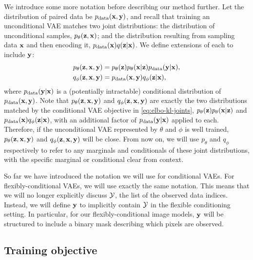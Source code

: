 We introduce some more notation before describing our method further. Let the
distribution of paired data be $p_{\rm{data}}({\mathbf{x}}, {\mathbf{y}})$, and recall that
training an unconditional VAE matches two joint distributions: the distribution
of unconditional samples, $p_\theta({\mathbf{z}}, {\mathbf{x}})$; and the distribution
resulting from sampling data ${\mathbf{x}}$ and then encoding it, $p_{\rm{data}}({\mathbf{x}})q({\mathbf{z}}|{\mathbf{x}})$. We define extensions of each to include ${\mathbf{y}}$:
\begin{align}
  p_\theta({\mathbf{z}}, {\mathbf{x}}, {\mathbf{y}}) &= p_\theta({\mathbf{z}})p_\theta({\mathbf{x}}|{\mathbf{z}})p_{\rm{data}}({\mathbf{y}}|{\mathbf{x}}), \label{eq:pmodel} \\
  q_\phi({\mathbf{z}}, {\mathbf{x}}, {\mathbf{y}}) &= p_{\rm{data}}({\mathbf{x}}, {\mathbf{y}})q_\phi({\mathbf{z}}|{\mathbf{x}}), \label{eq:r}
\end{align}
where $p_{\rm{data}}({\mathbf{y}}|{\mathbf{x}})$ is a (potentially intractable) conditional
distribution of $p_{\rm{data}}({\mathbf{x}}, {\mathbf{y}})$.
%
Note that $p_\theta({\mathbf{z}}, {\mathbf{x}}, {\mathbf{y}})$ and $q_\phi({\mathbf{z}}, {\mathbf{x}}, {\mathbf{y}})$ are exactly the two distributions matched by the conditional VAE
objective in \cref{eq:elbo-kl-joints}, $p_\theta({\mathbf{z}})p_\theta({\mathbf{x}}|{\mathbf{z}})$ and $p_{\rm{data}}({\mathbf{x}})q_\phi({\mathbf{z}}|{\mathbf{x}})$, with an additional factor of
$p_{\rm{data}}({\mathbf{y}}|{\mathbf{x}})$ applied to each.
%
Therefore, if the unconditional VAE represented by $\theta$ and $\phi$ is well
trained, $p_\theta({\mathbf{z}}, {\mathbf{x}}, {\mathbf{y}})$ and
$q_\phi({\mathbf{z}}, {\mathbf{x}}, {\mathbf{y}})$ will be close. From now on, we will use
$p_\theta$ and $q_\phi$ respectively to refer to any marginals and conditionals of these
joint distributions, with the specific marginal or conditional clear from
context.

So far we have introduced the notation we will use for conditional VAEs. For flexibly-conditional VAEs, we will use exactly the same notation. This means that we will no longer explicitly discuss ${\mathcal{Y}}$, the list of the observed data indices. Instead, we will define ${\mathbf{y}}$ to implicitly contain ${\mathcal{Y}}$ in the flexible conditioning setting. In particular, for our flexibly-conditional image models, ${\mathbf{y}}$ will be structured to include a binary mask describing which pixels are observed.

\subsection{Training objective}

